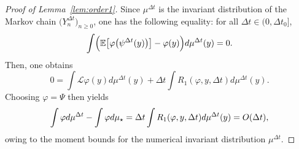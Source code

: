 \documentclass[10pt,a4paper]{amsart}
\newcommand{\E}{\mathbb{E}}
\begin{document}
\begin{proof}[Proof of Lemma~\ref{lem:order1}]
Since $\mu^{\Delta t}$ is the invariant distribution of the Markov chain $\bigl(Y_n^{\Delta t}\bigr)_{n\ge 0}$, one has the following equality: for all $\Delta t\in(0,\Delta t_0]$,
\begin{equation}\label{eq:equilibrium}
\int \Bigl(\E\bigl[\varphi\bigl(\psi^{\Delta t}(y)\bigr)\bigr]-\varphi(y)\Bigr)d\mu^{\Delta t}(y)=0.
\end{equation}
Then, one obtains
\[
0=\int \mathcal{L}\varphi(y)d\mu^{\Delta t}(y)+\Delta t\int R_1(\varphi,y,\Delta t) d\mu^{\Delta t}(y).
\]
Choosing $\varphi=\Psi$ then yields
\[
\int\varphi d\mu^{\Delta t}-\int\varphi d\mu_\star=\Delta t\int R_1(\varphi,y,\Delta t)d\mu^{\Delta t}(y)={\rm O}(\Delta t),
\]
owing to the moment bounds for the numerical invariant distribution $\mu^{\Delta t}$.
\end{proof}
\end{document}
